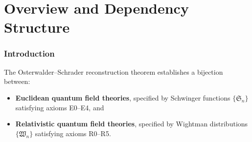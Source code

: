 \documentclass[11pt,a4paper]{article}
\newcommand{\sorry}{\texttt{sorry}}
\begin{document}
\begin{abstract}
\noindent
When a file-level support layer rather than a single theorem is being described,
the note says so explicitly instead of silently treating file completion as a
theorem-status claim.

\medskip\noindent
Whenever possible, the note also distinguishes three ways a declaration can look
``finished'' in source code: it may be genuinely sorry-free and axiom-free; it
may be sorry-free but still inherit a project axiom; or it may exist in Lean
while still inheriting \texttt{sorryAx} from unresolved support work.

\medskip\noindent
\textbf{Listing color code:}
\colorbox{green!6}{\strut Green} = sorry-free declaration shown verbatim.
\colorbox{orange!8}{\strut Orange} = Lean axiom.
\colorbox{red!6}{\strut Red} = explicit \sorry{} / open obligation.

\medskip\noindent
\textbf{Important reading rule for code excerpts.}
Some Lean snippets below retain source-style comments such as ``(PROVED)'' because
they are documenting what the source file says locally. Those comments should not
be read by themselves as dependency audits. Whenever the note discusses a main
theorem or route-defining declaration, the dependency-aware status is given in the
surrounding prose, charts, or tables.
\end{abstract}

\tableofcontents
\newpage

\part{Overview and Dependency Structure}

\section{Introduction}

The Osterwalder--Schrader reconstruction theorem establishes a bijection
between:
\begin{itemize}
\item \textbf{Euclidean quantum field theories}, specified by Schwinger
  functions $\{\mathfrak{S}_n\}$ satisfying axioms E0--E4, and
\item \textbf{Relativistic quantum field theories}, specified by Wightman
  distributions $\{\mathfrak{W}_n\}$ satisfying axioms R0--R5.
\end{itemize}
\end{document}
